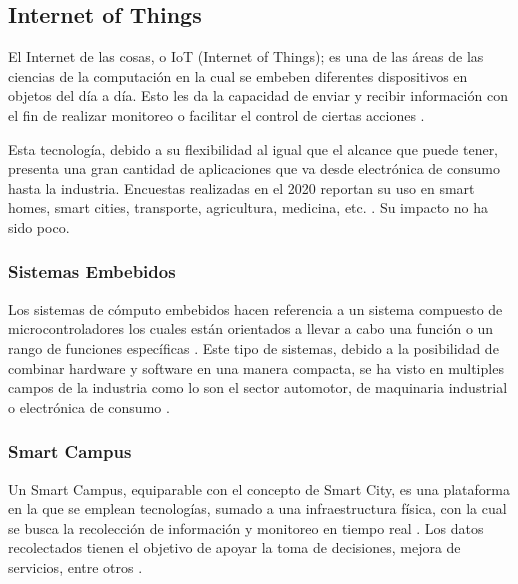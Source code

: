 \documentclass[12pt]{article}
\begin{document}
\subsection{Internet of Things}


El Internet de las cosas, o IoT (Internet of Things); es una de las áreas de las ciencias de la computación en la cual  se embeben diferentes dispositivos en objetos del día a día. Esto les da la capacidad de enviar y recibir información con el fin de realizar monitoreo o facilitar el control de ciertas acciones \cite{Berte_2018}.

Esta tecnología, debido a su flexibilidad al igual que el alcance que puede tener, presenta una gran cantidad de aplicaciones que va desde electrónica de consumo hasta la industria. Encuestas realizadas en el 2020 reportan su uso en smart homes, smart cities, transporte, agricultura, medicina, etc. \cite{Dawood_2020}. Su impacto no ha sido poco.

\subsubsection*{Sistemas Embebidos}


Los sistemas de cómputo embebidos hacen referencia a un sistema compuesto de microcontroladores los cuales están orientados a llevar a cabo una función o un rango de funciones específicas \cite{heath2002embedded}. Este tipo de sistemas, debido a la posibilidad de combinar hardware y software en una manera compacta, se ha visto en multiples campos de la industria como lo son el sector automotor, de maquinaria industrial o electrónica de consumo \cite{deichmann_2022}.


\subsubsection*{Smart Campus}


Un Smart Campus, equiparable con el concepto de Smart City, es una plataforma en la que se emplean tecnologías, sumado a una infraestructura física, con la cual se busca la recolección de información y monitoreo en tiempo real \cite{MinAllah2020}. Los datos recolectados tienen el objetivo de apoyar la toma de decisiones, mejora de servicios, entre otros \cite{Anagnostopoulos_2023}.
\end{document}
